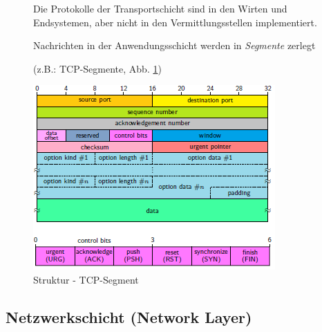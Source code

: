 \documentclass[12pt]{report}
\begin{document}
\begin{figure}[H]
  \begin{minipage}[t]{0.45\textwidth}
    Die Protokolle der Transportschicht sind in den Wirten und Endsystemen, aber nicht in den Vermittlungsstellen implementiert.
    
    Nachrichten in der Anwendungsschicht werden in \textit{Segmente} zerlegt
    
    (z.B.: TCP-Segmente, Abb. \ref{fig:tcp_segment})
  \end{minipage}
  \hfill
  \begin{minipage}[t]{0.45\textwidth}
    \caption{Struktur - TCP-Segment}
    \label{fig:tcp_segment}
    \centering
    \includegraphics[width=\textwidth]{tcp_diagram}
  \end{minipage}
\end{figure}


\subsection{Netzwerkschicht (Network Layer)}
\end{document}

